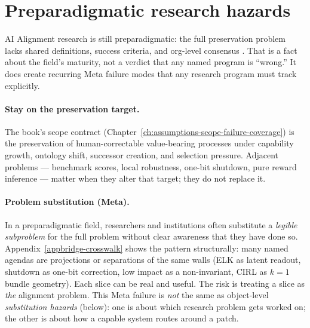 \section{Preparadigmatic research hazards}
\label{sec:preparadigmatic-hazards}
\begin{authbar}{AI}
Alignment research is still preparadigmatic: the full preservation problem lacks shared definitions, success criteria, and org-level consensus \autocite{soares2015technicalagenda}.
That is a fact about the field's maturity, not a verdict that any named program is ``wrong.''
It does create recurring Meta failure modes that any research program must track explicitly.

\paragraph{Stay on the preservation target.}
The book's scope contract (Chapter~\ref{ch:assumptions-scope-failure-coverage}) is the preservation of human-correctable value-bearing processes under capability growth, ontology shift, successor creation, and selection pressure.
Adjacent problems --- benchmark scores, local robustness, one-bit shutdown, pure reward inference --- matter when they alter that target; they do not replace it.

\paragraph{Problem substitution (Meta).}
In a preparadigmatic field, researchers and institutions often substitute a \emph{legible subproblem} for the full problem without clear awareness that they have done so.
Appendix~\ref{appbridge-crosswalk} shows the pattern structurally:
many named agendas are projections or separations of the same walls (ELK as latent readout, shutdown as one-bit correction, low impact as a non-invariant, CIRL as \(k=1\) bundle geometry).
Each slice can be real and useful.
The risk is treating a slice as \emph{the} alignment problem.
This Meta failure is \emph{not} the same as object-level \emph{substitution hazards} (below): one is about which research problem gets worked on; the other is about how a capable system routes around a patch.


\end{authbar}
